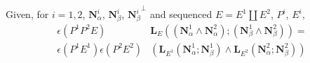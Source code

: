 \documentclass[Unicode]{cedram-alco}
\newcommand{\ext}[1]{\ensuremath{\mathbf{#1}}}
\newcommand{\dunion}{\coprod}
\newcommand{\LHorSub}[3]{\ext{L}_{#1}\left(  {#2}; {#3}  \right)}
\begin{document}
\begin{theo}\label{producttheorem}
Given, for $i = 1, 2$,
  $\ext{N}_\alpha^{i}$,  $\ext{N}_\beta^{i}$, ${\ext{N}_\beta^{i}}^\perp$ 
  and
  sequenced $E=E^{1}\dunion E^{2}$, $P^{i}$, $E^{i}$,
  \begin{equation}\label{productequation}
    \begin{split}
    \epsilon(P^1P^2E)
    &\LHorSub{E}
            {(\ext{N}_\alpha^{1}\wedge\ext{N}_\alpha^{2})}
            {(\ext{N}_\beta^{1}\wedge\ext{N}_\beta^{2})}
    = \\
    \epsilon(P^{1}E^{1})
    \epsilon(P^{2}E^{2}) 
        &\left(\LHorSub{E^{1}}{\ext{N}_\alpha^{1}}{\ext{N}_\beta^{1}}
        \wedge
        \LHorSub{E^{2}}{\ext{N}_\alpha^{2}}{\ext{N}_\beta^{2}}
          \right)
    \end{split}
  \end{equation}
\end{theo}
\end{document}
